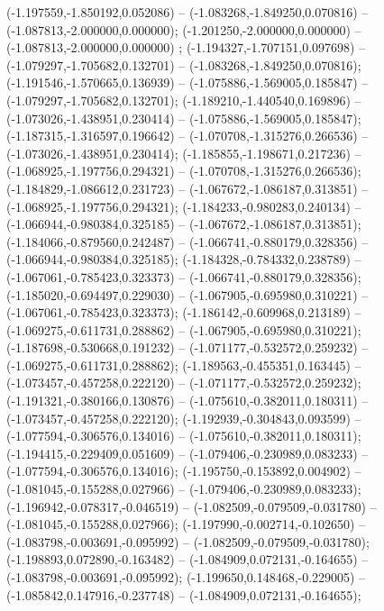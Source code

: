  (-1.197559,-1.850192,0.052086) -- (-1.083268,-1.849250,0.070816) -- (-1.087813,-2.000000,0.000000);
 (-1.201250,-2.000000,0.000000) -- (-1.087813,-2.000000,0.000000) ;
 (-1.194327,-1.707151,0.097698) -- (-1.079297,-1.705682,0.132701) -- (-1.083268,-1.849250,0.070816);
 (-1.191546,-1.570665,0.136939) -- (-1.075886,-1.569005,0.185847) -- (-1.079297,-1.705682,0.132701);
 (-1.189210,-1.440540,0.169896) -- (-1.073026,-1.438951,0.230414) -- (-1.075886,-1.569005,0.185847);
 (-1.187315,-1.316597,0.196642) -- (-1.070708,-1.315276,0.266536) -- (-1.073026,-1.438951,0.230414);
 (-1.185855,-1.198671,0.217236) -- (-1.068925,-1.197756,0.294321) -- (-1.070708,-1.315276,0.266536);
 (-1.184829,-1.086612,0.231723) -- (-1.067672,-1.086187,0.313851) -- (-1.068925,-1.197756,0.294321);
 (-1.184233,-0.980283,0.240134) -- (-1.066944,-0.980384,0.325185) -- (-1.067672,-1.086187,0.313851);
 (-1.184066,-0.879560,0.242487) -- (-1.066741,-0.880179,0.328356) -- (-1.066944,-0.980384,0.325185);
 (-1.184328,-0.784332,0.238789) -- (-1.067061,-0.785423,0.323373) -- (-1.066741,-0.880179,0.328356);
 (-1.185020,-0.694497,0.229030) -- (-1.067905,-0.695980,0.310221) -- (-1.067061,-0.785423,0.323373);
 (-1.186142,-0.609968,0.213189) -- (-1.069275,-0.611731,0.288862) -- (-1.067905,-0.695980,0.310221);
 (-1.187698,-0.530668,0.191232) -- (-1.071177,-0.532572,0.259232) -- (-1.069275,-0.611731,0.288862);
 (-1.189563,-0.455351,0.163445) -- (-1.073457,-0.457258,0.222120) -- (-1.071177,-0.532572,0.259232);
 (-1.191321,-0.380166,0.130876) -- (-1.075610,-0.382011,0.180311) -- (-1.073457,-0.457258,0.222120);
 (-1.192939,-0.304843,0.093599) -- (-1.077594,-0.306576,0.134016) -- (-1.075610,-0.382011,0.180311);
 (-1.194415,-0.229409,0.051609) -- (-1.079406,-0.230989,0.083233) -- (-1.077594,-0.306576,0.134016);
 (-1.195750,-0.153892,0.004902) -- (-1.081045,-0.155288,0.027966) -- (-1.079406,-0.230989,0.083233);
 (-1.196942,-0.078317,-0.046519) -- (-1.082509,-0.079509,-0.031780) -- (-1.081045,-0.155288,0.027966);
 (-1.197990,-0.002714,-0.102650) -- (-1.083798,-0.003691,-0.095992) -- (-1.082509,-0.079509,-0.031780);
 (-1.198893,0.072890,-0.163482) -- (-1.084909,0.072131,-0.164655) -- (-1.083798,-0.003691,-0.095992);
 (-1.199650,0.148468,-0.229005) -- (-1.085842,0.147916,-0.237748) -- (-1.084909,0.072131,-0.164655);

